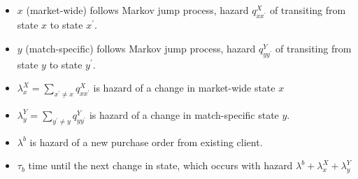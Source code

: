 \documentclass[notes=show]{beamer}
\begin{document}
\begin{frame}%

\label{pihat_derivation}



\begin{itemize}
\item $x$ (market-wide) follows Markov jump process, hazard $q_{xx^{\prime
}}^{X}$ of transiting from state $x$ to state $x^{\prime }.$

\item $y$ (match-specific) follows Markov jump process, hazard $%
q_{yy^{\prime }}^{Y}$ of transiting from state $y$ to state $y^{\prime }$.

\item $\lambda _{x}^{X}=\sum_{x^{\prime }\neq x}q_{xx^{\prime }}^{X}$ is
hazard of a change in market-wide state $x$

\item $\lambda _{y}^{Y}=\sum_{y^{\prime }\neq y}q_{yy^{\prime }}^{Y}$ is
hazard of a change in match-specific state $y$.

\item $\lambda ^{b}$ is hazard of a new purchase order from existing client.

\item $\tau _{b}$ time until the next change in state, which occurs with
hazard $\lambda ^{b}+\lambda _{x}^{X}+\lambda _{y}^{Y}$
\end{itemize}

\end{frame}%
\end{document}
